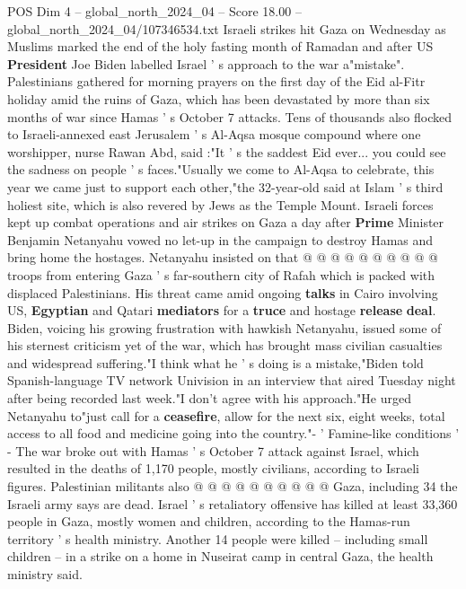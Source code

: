 \begin{textsample}{POS Dim 4 – global\_north\_2024\_04 – Score 18.00 – global\_north\_2024\_04/107346534.txt}  \label{ex:f4_pos_368}
Israeli strikes hit Gaza on Wednesday as Muslims marked the end of the holy fasting month of Ramadan and after US \textbf{President} Joe Biden labelled Israel ' s approach to the war a"mistake".
Palestinians gathered for morning prayers on the first day of the Eid al-Fitr holiday amid the ruins of Gaza, which has been devastated by more than six months of war since Hamas ' s October 7 attacks.
Tens of thousands also flocked to Israeli-annexed east Jerusalem ' s Al-Aqsa mosque compound where one worshipper, nurse Rawan Abd, said :"It ' s the saddest Eid ever... you could see the sadness on people ' s faces."Usually we come to Al-Aqsa to celebrate, this year we came just to support each other,"the 32-year-old said at Islam ' s third holiest site, which is also revered by Jews as the Temple Mount.
Israeli forces kept up combat operations and air strikes on Gaza a day after \textbf{Prime} Minister Benjamin Netanyahu vowed no let-up in the campaign to destroy Hamas and bring home the hostages.
Netanyahu insisted on that @ @ @ @ @ @ @ @ @ @ troops from entering Gaza ' s far-southern city of Rafah which is packed with displaced Palestinians.
His threat came amid ongoing \textbf{talks} in Cairo involving US, \textbf{Egyptian} and Qatari \textbf{mediators} for a \textbf{truce} and hostage \textbf{release} \textbf{deal}.
Biden, voicing his growing frustration with hawkish Netanyahu, issued some of his sternest criticism yet of the war, which has brought mass civilian casualties and widespread suffering."I think what he ' s doing is a mistake,"Biden told Spanish-language TV network Univision in an interview that aired Tuesday night after being recorded last week."I don't agree with his approach."He urged Netanyahu to"just call for a \textbf{ceasefire}, allow for the next six, eight weeks, total access to all food and medicine going into the country."- ' Famine-like conditions ' - The war broke out with Hamas ' s October 7 attack against Israel, which resulted in the deaths of 1,170 people, mostly civilians, according to Israeli figures.
Palestinian militants also @ @ @ @ @ @ @ @ @ @ Gaza, including 34 the Israeli army says are dead.
Israel ' s retaliatory offensive has killed at least 33,360 people in Gaza, mostly women and children, according to the Hamas-run territory ' s health ministry.
Another 14 people were killed -- including small children -- in a strike on a home in Nuseirat camp in central Gaza, the health ministry said.

\end{textsample}
